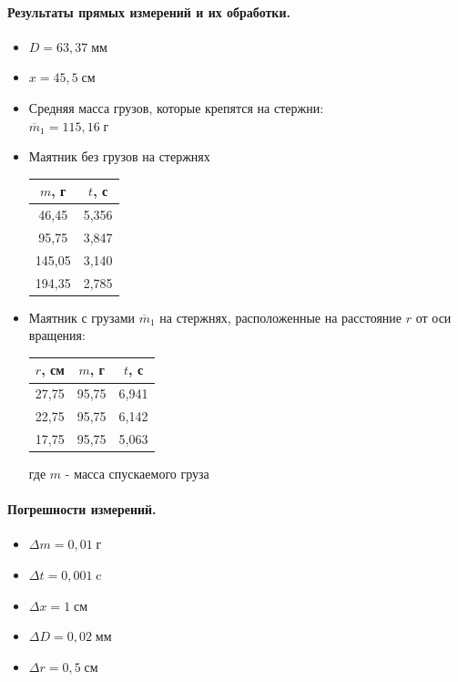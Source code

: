 \documentclass{article}
\begin{document}
\paragraph{Результаты прямых измерений и их обработки.}
\begin{itemize}
	\item $ D=63,37\;\mbox{мм} $
	\item $ x=45,5\;\mbox{см} $
	\item Средняя масса грузов, которые крепятся на стержни:\\
	$ \overline{m}_1 = 115,16\;\mbox{г}$
	\item Маятник без грузов на стержнях
	
	\begin{tabular}{c|c}
		
		$m$, г& $t$, с \\
		\hline
		46,45& 5,356 \\
		
		95,75& 3,847 \\
		
		145,05& 3,140 \\
		
		194,35& 2,785 \\
	\end{tabular}
\item Маятник с грузами $\overline{m}_1$ на стержнях, расположенные на расстояние $r$ от оси вращения:

\begin{tabular}{c|c|c}

	$r$, см&$m$, г& $t$, с \\
	\hline
	27,75&95,75  &6,941  \\
	22,75&95,75  &6,142  \\
	17,75&95,75  &5,063  \\
	
\end{tabular}

где $m$ - масса спускаемого груза
\end{itemize}

\paragraph{Погрешности измерений.}
\begin{itemize}
	\item $\Delta m = 0,01\;\mbox{г}$
	\item $\Delta t = 0,001\;\mbox{c}$
	\item $\Delta x = 1\;\mbox{см}$
	\item $\Delta D = 0,02\;\mbox{мм}$
	\item $\Delta r = 0,5\;\mbox{см}$
\end{itemize}
\end{document}
